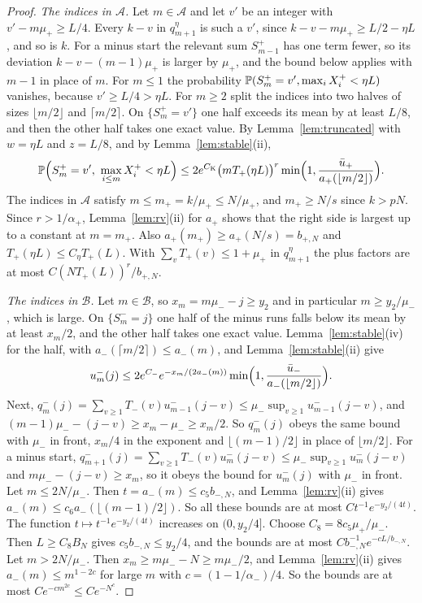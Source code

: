 \begin{proof}
\emph{The indices in $\mathcal A$.} Let $m\in\mathcal A$ and let $v'$ be an
integer with $v'-m\mu_\plus\ge L/4$. Every $k-v$ in $q^\eta_{m+1}$ is such a $v'$,
since $k-v-m\mu_\plus\ge L/2-\eta L$, and so is $k$. For a minus start the
relevant sum $S^\plus_{m-1}$ has one term fewer, so its deviation $k-v-(m-1)\mu_\plus$
is larger by $\mu_\plus$, and the bound below applies with $m-1$ in place of $m$.
For $m\le1$ the probability $\mathbb{P}(S^{+}_m=v',\max_iX^{+}_i<\eta L)$ vanishes,
because $v'\ge L/4>\eta L$. For $m\ge2$ split the indices into two halves of sizes
$\lfloor m/2\rfloor$ and $\lceil m/2\rceil$. On $\{S^\plus_m=v'\}$ one half exceeds
its mean by at least $L/8$, and then the other half takes one exact value. By
Lemma~\ref{lem:truncated} with $w=\eta L$ and $z=L/8$, and by
Lemma~\ref{lem:stable}(ii),
\[
 \mathbb{P}\Bigl(S^{+}_m=v',\ \max_{i\le m}X^{+}_i<\eta L\Bigr)\le2e^{C_{\mathrm K}}\bigl(mT_{+}(\eta L)\bigr)^r\min\Bigl(1,\frac{\bar u_{+}}{a_{+}(\lfloor m/2\rfloor)}\Bigr).
\]
The indices in $\mathcal A$ satisfy $m\le m_+=k/\mu_\plus\le N/\mu_\plus$, and
$m_+\ge N/s$ since $k>pN$. Since $r>1/\alpha_\plus$, Lemma~\ref{lem:rv}(ii) for
$a_\plus$ shows that the right side is largest up to a constant at $m=m_+$. Also
$a_\plus(m_+)\ge a_\plus(N/s)=b_{\plus,N}$ and $T_\plus(\eta L)\le C_\eta T_\plus(L)$.
With $\sum_vT_\plus(v)\le1+\mu_\plus$ in $q^\eta_{m+1}$ the plus factors are at most
$C(NT_\plus(L))^r/b_{\plus,N}$.

\emph{The indices in $\mathcal B$.} Let $m\in\mathcal B$, so $x_m=m\mu_\minus-j\ge y_2$
and in particular $m\ge y_2/\mu_\minus$, which is large. On $\{S^\minus_m=j\}$ one half
of the minus runs falls below its mean by at least $x_m/2$, and the other half
takes one exact value. Lemma~\ref{lem:stable}(iv) for the half, with
$a_\minus(\lceil m/2\rceil)\le a_\minus(m)$, and Lemma~\ref{lem:stable}(ii) give
\[
 u^{-}_m(j)\le2e^{C_-}e^{-x_m/(2a_{-}(m))}\min\Bigl(1,\frac{\bar u_{-}}{a_{-}(\lfloor m/2\rfloor)}\Bigr).
\]
Next, $q^\minus_m(j)=\sum_{v\ge1}T_\minus(v)u^\minus_{m-1}(j-v)\le\mu_\minus\sup_{v\ge1}u^\minus_{m-1}(j-v)$, and
$(m-1)\mu_\minus-(j-v)\ge x_m-\mu_\minus\ge x_m/2$. So $q^\minus_m(j)$ obeys the same bound
with $\mu_\minus$ in front, $x_m/4$ in the exponent and $\lfloor(m-1)/2\rfloor$ in
place of $\lfloor m/2\rfloor$. For a minus start,
$q^\minus_{m+1}(j)=\sum_{v\ge1}T_\minus(v)u^\minus_m(j-v)\le\mu_\minus\sup_{v\ge1}u^\minus_m(j-v)$
and $m\mu_\minus-(j-v)\ge x_m$, so it obeys the bound for $u^\minus_m(j)$ with
$\mu_\minus$ in front. Let $m\le2N/\mu_\minus$. Then $t=a_\minus(m)\le c_5b_{\minus,N}$,
and Lemma~\ref{lem:rv}(ii) gives $a_\minus(m)\le c_6a_\minus(\lfloor(m-1)/2\rfloor)$. So
all these bounds are at most $Ct^{-1}e^{-y_2/(4t)}$. The function
$t\mapsto t^{-1}e^{-y_2/(4t)}$ increases on $(0,y_2/4]$. Choose
$C_8=8c_5\mu_\plus/\mu_\minus$. Then $L\ge C_8B_N$ gives $c_5b_{\minus,N}\le y_2/4$,
and the bounds are at most $Cb_{\minus,N}^{-1}e^{-cL/b_{\minus,N}}$. Let
$m>2N/\mu_\minus$. Then $x_m\ge m\mu_\minus-N\ge m\mu_\minus/2$, and
Lemma~\ref{lem:rv}(ii) gives $a_\minus(m)\le m^{1-2c}$ for large $m$ with
$c=(1-1/\alpha_\minus)/4$. So the bounds are at most $Ce^{-cm^{2c}}\le Ce^{-N^c}$.


\end{proof}
